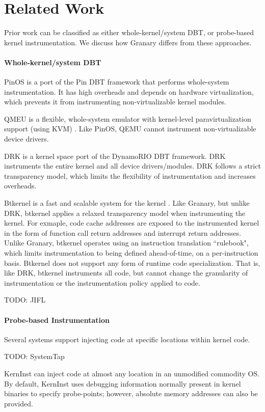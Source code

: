 \documentclass[preprint]{sigplanconf}
\begin{document}
\section{Related Work}\label{sec:related}
Prior work can be classified as either whole-kernel/system DBT, or probe-based kernel instrumentation. We discuss how Granary differs from these approaches.
\paragraph{Whole-kernel/system DBT}
PinOS \cite{PinOS} is a port of the Pin \cite{Pin} DBT framework that performs whole-system instrumentation. It has high overheads and depends on hardware virtualization, which prevents it from instrumenting non-virtualizable kernel modules. 

QMEU is a flexible, whole-system emulator with kernel-level paravirtualization support (using KVM) \cite{QEMU}. Like PinOS, QEMU cannot instrument non-virtualizable device drivers.

DRK \cite{DRK} is a kernel space port of the DynamoRIO \cite{DynamoRIO} DBT framework. DRK instruments the entire kernel and all device drivers/modules. DRK follows a strict transparency model, which limits the flexibility of instrumentation and increases overheads. 

Btkernel is a fast and scalable system for the kernel \cite{btkernel}. Like Granary, but unlike DRK, btkernel applies a relaxed transparency model when instrumenting the kernel. For exmaple, code cache addresses are exposed to the instrumented kernel in the form of function call return addresses and interrupt return addresses. Unlike Granary, btkernel operates using an instruction translation ``rulebook", which limits instrumentation to being defined ahead-of-time, on a per-instruction basis. Btkernel does not support any form of runtime code specialization. That is, like DRK, btkernel instruments all code, but cannot change the granularity of instrumentation or the instrumentation policy applied to code.

TODO: JIFL

\paragraph{Probe-based Instrumentation} Several systems support injecting code at specific locations within kernel code.

TODO: SystemTap

KernInst \cite{KernInst} can inject code at almost any location in an unmodified commodity OS. By default, KernInst uses debugging information normally present in kernel binaries to specify probe-points; however, absolute memory addresses can also be provided.
\end{document}
